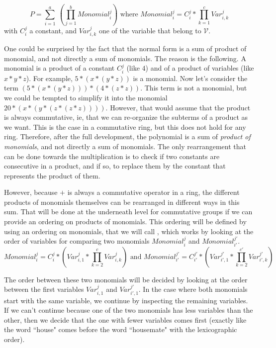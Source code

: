 \[
P = \sum_{i=1}^{a}\ (\prod_{j=1}^{b} Monomial_{i}^j)
\text{ where } 
Monomial_{i}^j = C_{i}^j * \prod_{k=1}^{c} Var_{i,k}^{j}
\]
with $C_{i}^j$ a constant, and $Var_{i,k}^{j}$ one of the variable that belong to $\mathcal{V}$.

One could be surprised by the fact that the normal form is a sum of product of monomial, and not directly a sum of monomials. The reason is the following. A monomial is a product of a constant $C_{i}^j$ (like $4$) and of a product of variables (like $x*y*z$). For example,  $5*(x*(y*z))$ is a monomial. Now let's consider the term $(5*(x*(y*z))) * (4*(z*z))$. This term is not a monomial, but we could be tempted to simplify it into the monomial $20*(x*(y*(z*(z*z))))$. However, that would assume that the product is always commutative, ie, that we can re-organize the subterms of a product as we want. This is the case in a commutative ring, but this does not hold for any ring. Therefore, after the full development, the polynomial is a sum of \emph{product of monomials}, and not directly a sum of monomials. The only rearrangement that can be done towards the multiplication is to check if two constants are consecutive in a product, and if so, to replace them by the constant that represents the product of them.

However, because $+$ is always a commutative operator in a ring, the different products of monomials themselves can be rearranged in different ways in this sum. That will be done at the underneath level for commutative groups if we can provide an ordering on products of monomials. This ordering will be defined by using an ordering on monomials, that we will call , which works by looking at the order of variables for comparing two monomials $Monomial_{i}^{j}$ and $Monomial_{i'}^{j'}$.
\[
Monomial_{i}^{j} = C_{i}^{j} * (Var_{i,1}^{j} * \prod_{k=2}^{c} Var_{i,k}^{j})
\text{ and }
Monomial_{i'}^{j'} = C_{i'}^{j'} * (Var_{i',1}^{j'} * \prod_{k=2}^{c'} Var_{i',k}^{j'})
\]

The order between these two monomials will be decided by looking at the order between the first variables $Var_{i,1}^{j}$ and $Var_{i',1}^{j'}$. In the case where both monomials start with the same variable, we continue by inspecting the remaining variables. If we can't continue because one of the two monomials has less variables than the other, then we decide that the one with fewer variables comes first (exactly like the word ``house" comes before the word ``housemate" with the lexicographic order).

